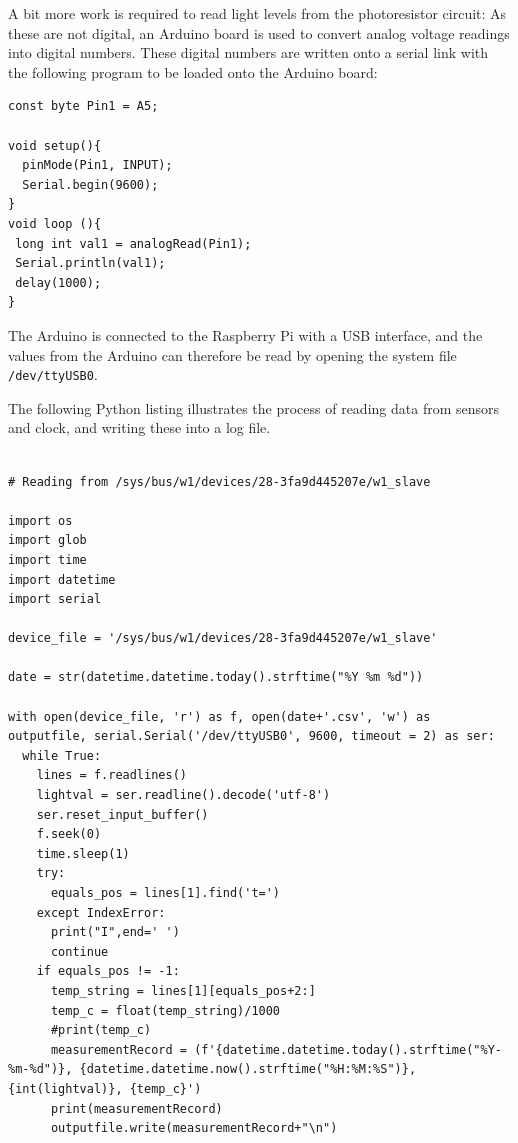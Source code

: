 \documentclass[a4paper,12pt]{article}
\begin{document}
A bit more work is required to read light levels from the photoresistor circuit: As these are not digital, an Arduino board is used to convert analog
voltage readings into digital numbers. These digital numbers are written onto a serial link with the following program to be loaded onto the
Arduino board: 

\begin{lstlisting}
const byte Pin1 = A5;

void setup(){
  pinMode(Pin1, INPUT);
  Serial.begin(9600);
}
void loop (){
 long int val1 = analogRead(Pin1);
 Serial.println(val1);
 delay(1000);
}

\end{lstlisting}

The Arduino is connected to the Raspberry Pi with a USB interface, and the values from the Arduino can
therefore be read by opening the system file \verb|/dev/ttyUSB0|.

The following Python listing illustrates the process of reading data from sensors and clock,
and writing these into a log file.

\begin{listing}
\begin{verbatim}
    
# Reading from /sys/bus/w1/devices/28-3fa9d445207e/w1_slave

import os
import glob
import time
import datetime
import serial

device_file = '/sys/bus/w1/devices/28-3fa9d445207e/w1_slave' 

date = str(datetime.datetime.today().strftime("%Y %m %d"))

with open(device_file, 'r') as f, open(date+'.csv', 'w') as outputfile, serial.Serial('/dev/ttyUSB0', 9600, timeout = 2) as ser:
  while True:
    lines = f.readlines()
    lightval = ser.readline().decode('utf-8')
    ser.reset_input_buffer()
    f.seek(0)
    time.sleep(1)
    try:
      equals_pos = lines[1].find('t=')
    except IndexError:
      print("I",end=' ')
      continue
    if equals_pos != -1:
      temp_string = lines[1][equals_pos+2:]
      temp_c = float(temp_string)/1000
      #print(temp_c)
      measurementRecord = (f'{datetime.datetime.today().strftime("%Y-%m-%d")}, {datetime.datetime.now().strftime("%H:%M:%S")}, {int(lightval)}, {temp_c}')
      print(measurementRecord)
      outputfile.write(measurementRecord+"\n")


\end{verbatim}
\end{listing}
\end{document}
